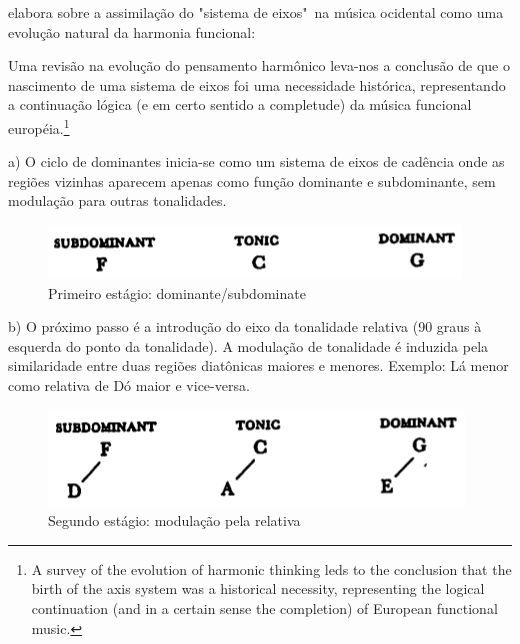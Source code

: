 \documentclass[
	12pt,				%
	openright,			%
	twoside,			%
	a4paper,			%
	english,			%
	french,				%
	spanish,			%
	brazil				%
	]{abntex2}
\begin{document}
 elabora sobre a assimilação do "sistema de eixos"\ na música ocidental como uma evolução natural da harmonia funcional:  

\begin{citacao}
Uma revisão na evolução do pensamento harmônico leva-nos a conclusão de que o nascimento de uma sistema de eixos foi uma necessidade histórica, representando a continuação lógica (e em certo sentido a completude) da música funcional européia.\cite[p. 08]{lendvai1971bela}\footnote{A survey of the evolution of harmonic thinking leds to the conclusion that the birth of the axis system was a historical necessity, representing the logical continuation (and in a certain sense the completion) of European functional music.\cite[p. 08]{lendvai1971bela}}
\end{citacao}


a) O ciclo de dominantes inicia-se como um sistema de eixos de cadência onde as regiões vizinhas aparecem apenas como função dominante e subdominante, sem modulação para outras tonalidades. 

\begin{figure}[!h]
	\caption{\label{fig_grafico}Primeiro estágio: dominante/subdominate}
	\begin{center}
	    \includegraphics[scale=0.5]{axis/estagio01.png}
	\end{center}
\end{figure}


b) O próximo passo é a introdução do eixo da tonalidade relativa (90 graus à esquerda do ponto da tonalidade). A modulação de tonalidade é induzida pela similaridade entre duas regiões diatônicas maiores e menores. Exemplo: Lá menor como relativa de Dó maior e vice-versa.

\begin{figure}[!h]
	\caption{\label{fig_grafico}Segundo estágio: modulação pela relativa}
	\begin{center}
	    \includegraphics[scale=0.5]{axis/estagio02.png}
	\end{center}
\end{figure}
\end{document}
